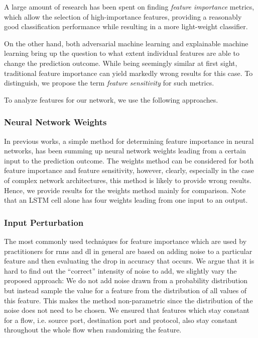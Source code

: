 \documentclass[conference]{IEEEtran}
\begin{document}
A large amount of research has been spent on finding \emph{feature importance} metrics, which allow the selection  of high-importance features, providing a reasonably good classification performance while resulting in a more light-weight classifier.

On the other hand, both adversarial machine learning and explainable machine learning bring up the question to what extent individual features are able to change the prediction outcome. While being seemingly similar at first sight, traditional feature importance can yield markedly wrong results for this case.  To distinguish, we propose the term \emph{feature sensitivity} for such metrics.

To analyze features for our network, we use the following approaches.

\subsubsection{Neural Network Weights}
In previous works, a simple method for determining feature importance in neural networks, has been summing up neural network weights leading from a certain input to the prediction outcome. The weights method can be considered for both feature importance and feature sensitivity, however, clearly, especially in the case of complex network architectures, this method is likely to provide wrong results. Hence, we provide results for the weights method mainly for comparison. Note that an LSTM cell alone has four weights leading from one input to an output. 

\subsubsection{Input Perturbation}

 The most commonly used techniques for feature importance which are used by practitioners for \glspl{rnn} \cite{stackexchange_cross_validated_neural_2019} and \gls{dl} \cite{stackexchange_cross_validated_feature_2016} in general are based on adding noise to a particular feature and then evaluating the drop in accuracy that occurs. We argue that it is hard to find out the ``correct'' intensity of noise to add, we slightly vary the proposed approach: We do not add noise drawn from a probability distribution but instead sample the value for a feature from the distribution of all values of this feature. This makes the method non-parametric since the distribution of the noise does not need to be chosen. We ensured that features which stay constant for a flow, i.e. source port, destination port and protocol, also stay constant throughout the whole flow when randomizing the feature.
\end{document}
